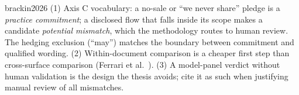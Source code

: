 \begin{papercard}{brackin2026}
 (1) Axis C vocabulary: a no-sale or ``we never share'' pledge is a \emph{practice commitment}; a disclosed flow that falls inside its scope makes a candidate \emph{potential mismatch}, which the methodology routes to human review. The hedging exclusion (``may'') matches the boundary between commitment and qualified wording. (2) Within-document comparison is a cheaper first step than cross-surface comparison (Ferrari et al.\ ). (3) A model-panel verdict without human validation is the design the thesis avoids; cite it as such when justifying manual review of all mismatches.
\end{papercard}
